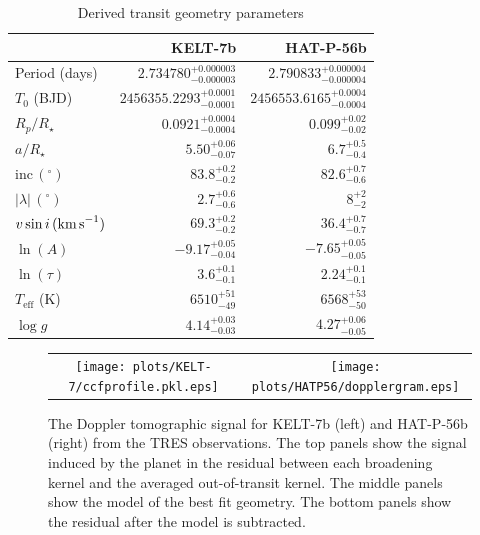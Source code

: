 \documentclass[useAMS,usenatbib]{mn2e}
\begin{document}
\begin{table}
  
  \caption{\label{tab:parameters}Derived transit geometry parameters}
  \begin{tabular}{lrr}
    \hline\hline
    & \textbf{KELT-7b} & \textbf{HAT-P-56b}\\
    \hline
    Period (days)  & $2.734780_{-0.000003}^{+0.000003}$ & $2.790833_{-0.000004}^{+0.000004}$ \\
    $T_0$ (BJD)  & $2456355.2293_{-0.0001}^{+0.0001}$ & $2456553.6165_{-0.0004}^{+0.0004}$ \\
    $R_p/R_\star$  & $0.0921_{-0.0004}^{+0.0004}$ & $0.099_{-0.02}^{+0.02}$ \\
    $a/R_\star$  & $5.50_{-0.07}^{+0.06}$ &  $6.7_{-0.4}^{+0.5}$ \\
    $\text{inc}\,(^\circ)$  & $83.8_{-0.2}^{+0.2}$ & $82.6_{-0.6}^{+0.7}$\\
    $|\lambda|\,(^\circ)$  & $2.7_{-0.6}^{+0.6}$ & $8_{-2}^{+2}$\\
    $v\sin i\,(\text{km\,s}^{-1})$  & $69.3_{-0.2}^{+0.2}$ & $36.4_{-0.7}^{+0.7}$\\
    $\ln(A)$  & $-9.17_{-0.04}^{+0.05}$ & $-7.65_{-0.05}^{+0.05}$ \\
    $\ln(\tau)$  & $3.6_{-0.1}^{+0.1}$ & $2.24_{-0.1}^{+0.1}$\\
    $T_\mathrm{eff}$ (K)  & $6510_{-49}^{+51}$& $6568_{-50}^{+53}$\\
    $\log g$  & $4.14_{-0.03}^{+0.03}$& $4.27_{-0.05}^{+0.06}$\\
    \hline
  \end{tabular}
\end{table}

\begin{figure}
  \begin{tabular}{cc}
    \texttt{[image: plots/KELT-7/ccfprofile.pkl.eps]} &
    \texttt{[image: plots/HATP56/dopplergram.eps]} \\
  \end{tabular}
  
  \caption{\label{fig:dopplergram}The Doppler tomographic signal for KELT-7b (left) and HAT-P-56b (right) from the TRES observations. The top panels show the signal induced by the planet in the residual between each broadening kernel and the averaged out-of-transit kernel. The middle panels show the model of the best fit geometry. The bottom panels show the residual after the model is subtracted. }
\end{figure}
\end{document}
